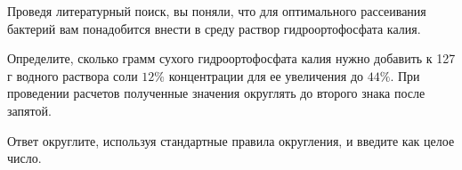 
Проведя литературный поиск, вы поняли, что для оптимального рассеивания бактерий вам понадобится 
внести в среду раствор гидроортофосфата калия.

Определите, сколько грамм сухого гидроортофосфата калия нужно добавить к 127 г водного раствора соли $12\%$ 
концентрации для ее увеличения до $44\%$. При проведении расчетов полученные значения округлять до 
второго знака после запятой.

Ответ округлите, используя стандартные правила округления, и введите как целое число.